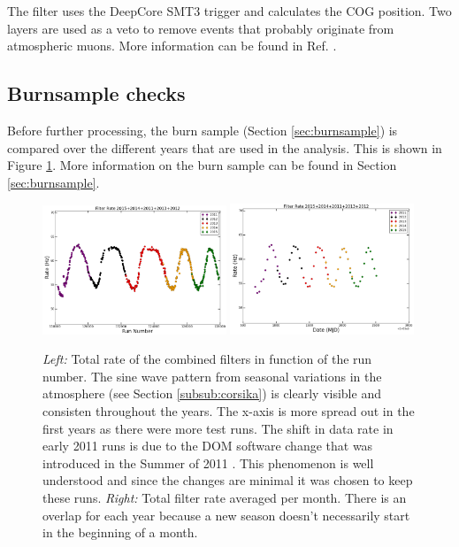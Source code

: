 \noindent The filter uses the DeepCore SMT3 trigger and calculates the COG position. Two layers are used as a veto to remove events that probably originate from atmospheric muons. More information can be found in Ref. \cite{DeepCore2012}.

\subsection{Burnsample checks}
Before further processing, the burn sample (Section \ref{sec:burnsample}) is compared over the different years that are used in the analysis. This is shown in Figure \ref{fig:burnsamplechecks}. More information on the burn sample can be found in Section \ref{sec:burnsample}.

\begin{figure}[t]
\centering
\includegraphics[width=0.49\textwidth]{chapter8/img/FilterRatePerRun.png}
\includegraphics[width=0.49\textwidth]{chapter8/img/FilterRatePerMonth.png}
\caption{\textit{Left: }Total rate of the combined filters in function of the run number. The sine wave pattern from seasonal variations in the atmosphere (see Section \ref{subsub:corsika}) is clearly visible and consisten throughout the years. The x-axis is more spread out in the first years as there were more test runs. The shift in data rate in early 2011 runs is due to the DOM software change that was introduced in the Summer of 2011 \cite{2011rate}. This phenomenon is well understood and since the changes are minimal it was chosen to keep these runs. \textit{Right: }Total filter rate averaged per month. There is an overlap for each year because a new season doesn't necessarily start in the beginning of a month.}
\label{fig:burnsamplechecks}
\end{figure}

